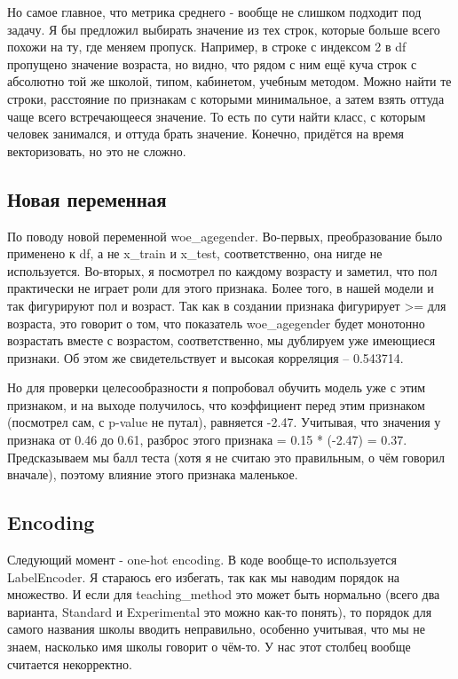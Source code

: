 Но самое главное, что метрика среднего - вообще не слишком подходит под задачу. Я бы предложил выбирать значение из тех строк, которые больше всего похожи на ту, где меняем пропуск. Например, в строке с индексом 2 в df пропущено значение возраста, но видно, что рядом с ним ещё куча строк с абсолютно той же школой, типом, кабинетом, учебным методом. Можно найти те строки, расстояние по признакам с которыми минимальное, а затем взять оттуда чаще всего встречающееся значение. То есть по сути найти класс, с которым человек занимался, и оттуда брать значение. Конечно, придётся на время векторизовать, но это не сложно.

\subsection*{Новая переменная}
По поводу новой переменной woe\_agegender. Во-первых, преобразование было применено к df, а не x\_train и x\_test, соответственно, она нигде не используется. Во-вторых, я посмотрел по каждому возрасту и заметил, что пол практически не играет роли для этого признака. Более того, в нашей модели и так фигурируют пол и возраст. Так как в создании признака фигурирует >= для возраста, это говорит о том, что показатель woe\_agegender будет монотонно возрастать вместе с возрастом, соответственно, мы дублируем уже имеющиеся признаки. Об этом же свидетельствует и высокая корреляция -- 0.543714.

Но для проверки целесообразности я попробовал обучить модель уже с этим признаком, и на выходе получилось, что коэффициент перед этим признаком (посмотрел сам, с p-value не путал), равняется -2.47. Учитывая, что значения у признака от 0.46 до 0.61, разброс этого признака = 0.15 * (-2.47) = 0.37. Предсказываем мы балл теста (хотя я не считаю это правильным, о чём говорил вначале), поэтому влияние этого признака маленькое.

\subsection*{Encoding}
Следующий момент - one-hot encoding. В коде вообще-то используется LabelEncoder. Я стараюсь его избегать, так как мы наводим порядок на множество. И если для teaching\_method это может быть нормально (всего два варианта, Standard и Experimental это можно как-то понять), то порядок для самого названия школы вводить неправильно, особенно учитывая, что мы не знаем, насколько имя школы говорит о чём-то. У нас этот столбец вообще считается некорректно.

